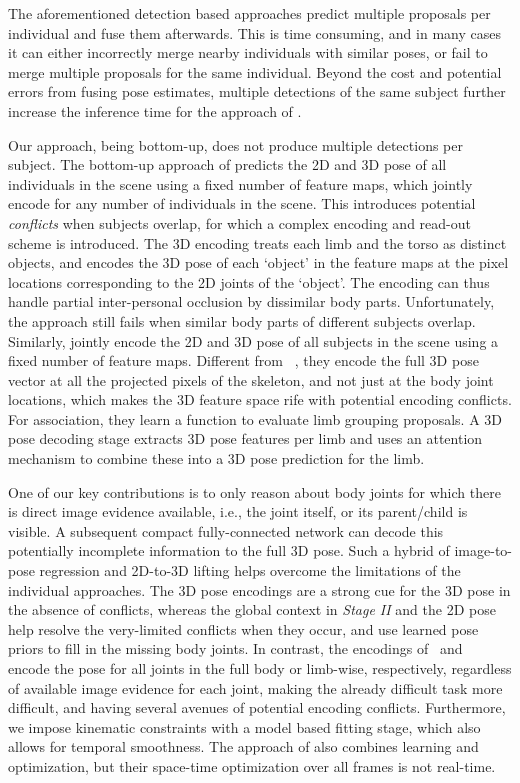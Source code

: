 \documentclass[acmtog,authorversion]{acmart}
\begin{document}
The aforementioned detection based approaches predict multiple proposals per individual and fuse them afterwards. This is time consuming, and in many cases it can either incorrectly merge nearby individuals with similar poses, or fail to merge multiple proposals for the same individual. Beyond the cost and potential errors from fusing pose estimates, multiple detections of the same subject further increase the inference time for the approach of \citet{Moon_2019_ICCV_3DMPPE}. 

Our approach, being bottom-up, does not produce multiple detections per subject. The bottom-up approach of 
\citet{mehta_3dv18} 
predicts the 2D and 3D pose of all individuals in the scene using a fixed number of feature maps, which jointly encode for any number of individuals in the scene. 
This introduces potential \emph{conflicts} when subjects overlap, for which a complex encoding and read-out scheme is introduced.
The 3D encoding treats each limb and the torso as distinct objects, and encodes the 3D pose of each `object' in the feature maps at the pixel locations corresponding to the 2D joints of the `object'. The encoding can thus handle partial inter-personal occlusion by dissimilar body parts. Unfortunately, the approach still fails when similar body parts of different subjects overlap.
Similarly, \citet{zanfir_nips18} jointly encode the 2D and 3D pose of all subjects in the scene using a fixed number of feature maps. 
Different from ~\citet{mehta_3dv18}, they encode the full 3D pose vector at all the projected pixels of the skeleton, and not just at the body joint locations, which makes the 3D feature space rife with potential encoding conflicts. For association, they learn a function to evaluate limb grouping proposals. 
A 3D pose decoding stage extracts 3D pose features per limb and uses an attention mechanism to combine these into a 3D pose prediction for the limb. 


One of our key contributions 
is to only reason about body joints for which there is direct image evidence available, i.e., the joint itself, or its parent/child is visible. A subsequent compact fully-connected network can decode this potentially incomplete information to the full 3D pose. 
Such a hybrid of image-to-pose regression and 2D-to-3D lifting helps overcome the limitations of the individual approaches. 
The 3D pose encodings are a strong cue for the 3D pose in the absence of conflicts, whereas the global context in \textit{Stage II} and the 2D pose help resolve the very-limited conflicts when they occur, and use learned pose priors to fill in the missing body joints. 
In contrast, the encodings of~\citet{zanfir_nips18} and~\citet{mehta_3dv18} encode the pose for all joints in the full body or limb-wise, respectively, regardless of available image evidence for each joint, making the already difficult task more difficult, and having several avenues of potential encoding conflicts.
Furthermore, we impose kinematic constraints with a model based fitting stage, which also allows for temporal smoothness.
The approach of \citet{zanfir2018monocular} also combines learning and optimization, but their space-time optimization over all frames is not real-time.
\end{document}
